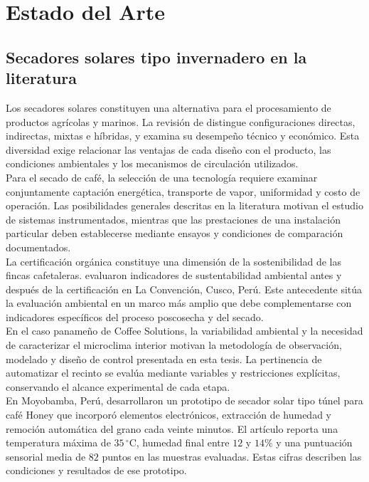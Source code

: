 \chapter{Estado del Arte}

\section{Secadores solares tipo invernadero en la literatura}



Los secadores solares constituyen una alternativa para el procesamiento de productos agrícolas y marinos. La revisión de \textcite{fudholi2010} distingue configuraciones directas, indirectas, mixtas e híbridas, y examina su desempeño técnico y económico. Esta diversidad exige relacionar las ventajas de cada diseño con el producto, las condiciones ambientales y los mecanismos de circulación utilizados.\\

Para el secado de café, la selección de una tecnología requiere examinar conjuntamente captación energética, transporte de vapor, uniformidad y costo de operación. Las posibilidades generales descritas en la literatura motivan el estudio de sistemas instrumentados, mientras que las prestaciones de una instalación particular deben establecerse mediante ensayos y condiciones de comparación documentados.\\

La certificación orgánica constituye una dimensión de la sostenibilidad de las fincas cafetaleras. \textcite{marquez2016} evaluaron indicadores de sustentabilidad ambiental antes y después de la certificación en La Convención, Cusco, Perú. Este antecedente sitúa la evaluación ambiental en un marco más amplio que debe complementarse con indicadores específicos del proceso poscosecha y del secado.\\


En el caso panameño de Coffee Solutions, la variabilidad ambiental y la necesidad de caracterizar el microclima interior motivan la metodología de observación, modelado y diseño de control presentada en esta tesis. La pertinencia de automatizar el recinto se evalúa mediante variables y restricciones explícitas, conservando el alcance experimental de cada etapa.\\

En Moyobamba, Perú, \textcite{davila2022} desarrollaron un prototipo de secador solar tipo túnel para café Honey que incorporó elementos electrónicos, extracción de humedad y remoción automática del grano cada veinte minutos. El artículo reporta una temperatura máxima de $35\,^{\circ}\mathrm C$, humedad final entre $12$ y $14\%$ y una puntuación sensorial media de $82$ puntos en las muestras evaluadas. Estas cifras describen las condiciones y resultados de ese prototipo.\\

